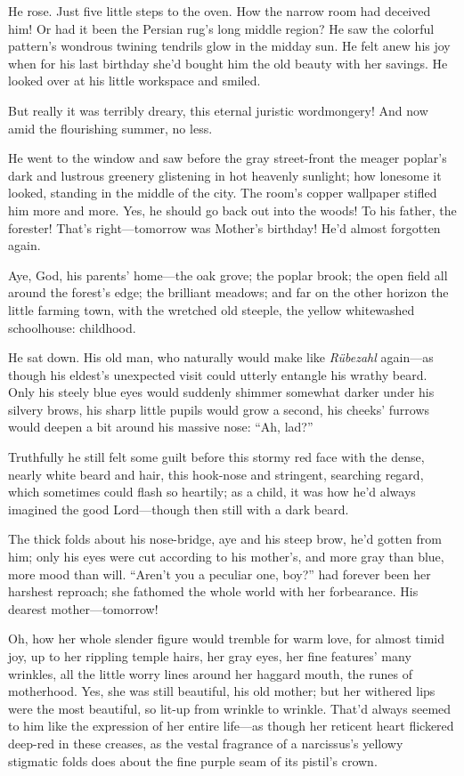 \documentclass[12pt,a4paper]{article}
\begin{document}
He rose. Just five little steps to the oven. How the narrow room had deceived him! Or had it been the Persian rug’s long middle region? He saw the colorful pattern’s wondrous twining tendrils glow in the midday sun. He felt anew his joy when for his last birthday she’d bought him the old beauty with her savings. He looked over at his little workspace and smiled.

But really it was terribly dreary, this eternal juristic wordmongery! And now amid the flourishing summer, no less.

He went to the window and saw before the gray street-front the meager poplar’s dark and lustrous greenery glistening in hot heavenly sunlight; how lonesome it looked, standing in the middle of the city. The room’s copper wallpaper stifled him more and more. Yes, he should go back out into the woods! To his father, the forester! That’s right—tomorrow was Mother’s birthday! He’d almost forgotten again.

Aye, God, his parents’ home—the oak grove; the poplar brook; the open field all around the forest’s edge; the brilliant meadows; and far on the other horizon the little farming town, with the wretched old steeple, the yellow whitewashed schoolhouse: childhood.

He sat down. His old man, who naturally would make like \textit{Rübezahl} again—as though his eldest’s unexpected visit could utterly entangle his wrathy beard. Only his steely blue eyes would suddenly shimmer somewhat darker under his silvery brows, his sharp little pupils would grow a second, his cheeks’ furrows would deepen a bit around his massive nose: “Ah, lad?”

Truthfully he still felt some guilt before this stormy red face with the dense, nearly white beard and hair, this hook-nose and stringent, searching regard, which sometimes could flash so heartily; as a child, it was how he’d always imagined the good Lord—though then still with a dark beard.

The thick folds about his nose-bridge, aye and his steep brow, he’d gotten from him; only his eyes were cut according to his mother’s, and more gray than blue, more mood than will. “Aren’t you a peculiar one, boy?” had forever been her harshest reproach; she fathomed the whole world with her forbearance. His dearest mother—tomorrow!

Oh, how her whole slender figure would tremble for warm love, for almost timid joy, up to her rippling temple hairs, her gray eyes, her fine features’ many wrinkles, all the little worry lines around her haggard mouth, the runes of motherhood. Yes, she was still beautiful, his old mother; but her withered lips were the most beautiful, so lit-up from wrinkle to wrinkle. That’d always seemed to him like the expression of her entire life—as though her reticent heart flickered deep-red in these creases, as the vestal fragrance of a narcissus’s yellowy stigmatic folds does about the fine purple seam of its pistil’s crown.
\end{document}
